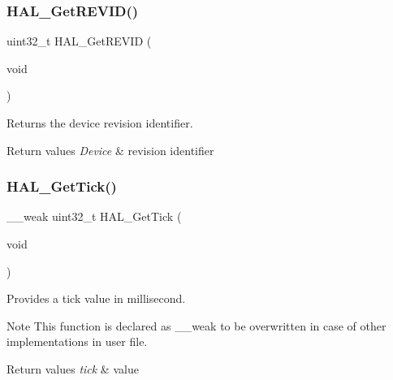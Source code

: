 \subsubsection{\texorpdfstring{H\+A\+L\+\_\+\+Get\+R\+E\+V\+I\+D()}{HAL\_GetREVID()}}
{\footnotesize\ttfamily uint32\+\_\+t H\+A\+L\+\_\+\+Get\+R\+E\+V\+ID (\begin{DoxyParamCaption}\item[{void}]{ }\end{DoxyParamCaption})}



Returns the device revision identifier. 


\begin{DoxyRetVals}{Return values}
{\em Device} & revision identifier \\
\hline
\end{DoxyRetVals}
\mbox{\label{group___h_a_l___exported___functions___group2_gac9b3a85a73735ac840d0dcb59bc0fdd6}} 
\subsubsection{\texorpdfstring{H\+A\+L\+\_\+\+Get\+Tick()}{HAL\_GetTick()}}
{\footnotesize\ttfamily \+\_\+\+\_\+weak uint32\+\_\+t H\+A\+L\+\_\+\+Get\+Tick (\begin{DoxyParamCaption}\item[{void}]{ }\end{DoxyParamCaption})}



Provides a tick value in millisecond. 

\begin{DoxyNote}{Note}
This function is declared as \+\_\+\+\_\+weak to be overwritten in case of other implementations in user file. 
\end{DoxyNote}

\begin{DoxyRetVals}{Return values}
{\em tick} & value \\
\hline
\end{DoxyRetVals}
\mbox{\label{group___h_a_l___exported___functions___group2_ga803cdbcc0883bcf5f5c98c50024c97e6}} 

